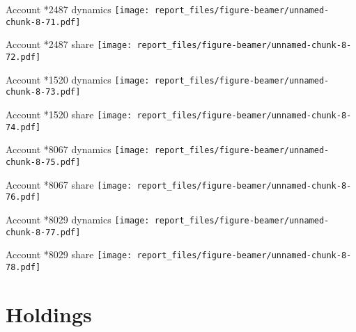 \documentclass[ignorenonframetext,]{beamer}
\begin{document}
\begin{frame}{Account *2487 dynamics
\texttt{[image: report\_files/figure-beamer/unnamed-chunk-8-71.pdf]}}
\protect\hypertarget{account-2487-dynamics}{}

\end{frame}

\begin{frame}{Account *2487 share
\texttt{[image: report\_files/figure-beamer/unnamed-chunk-8-72.pdf]}}
\protect\hypertarget{account-2487-share}{}

\end{frame}

\begin{frame}{Account *1520 dynamics
\texttt{[image: report\_files/figure-beamer/unnamed-chunk-8-73.pdf]}}
\protect\hypertarget{account-1520-dynamics}{}

\end{frame}

\begin{frame}{Account *1520 share
\texttt{[image: report\_files/figure-beamer/unnamed-chunk-8-74.pdf]}}
\protect\hypertarget{account-1520-share}{}

\end{frame}

\begin{frame}{Account *8067 dynamics
\texttt{[image: report\_files/figure-beamer/unnamed-chunk-8-75.pdf]}}
\protect\hypertarget{account-8067-dynamics}{}

\end{frame}

\begin{frame}{Account *8067 share
\texttt{[image: report\_files/figure-beamer/unnamed-chunk-8-76.pdf]}}
\protect\hypertarget{account-8067-share}{}

\end{frame}

\begin{frame}{Account *8029 dynamics
\texttt{[image: report\_files/figure-beamer/unnamed-chunk-8-77.pdf]}}
\protect\hypertarget{account-8029-dynamics}{}

\end{frame}

\begin{frame}{Account *8029 share
\texttt{[image: report\_files/figure-beamer/unnamed-chunk-8-78.pdf]}}
\protect\hypertarget{account-8029-share}{}

\end{frame}

\hypertarget{holdings}{%
\section{Holdings}\label{holdings}}
\end{document}
